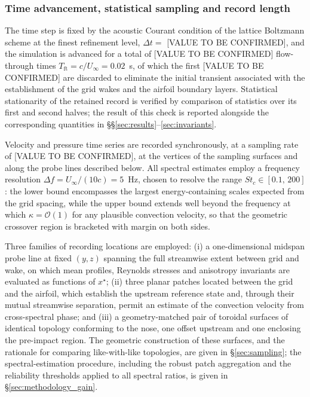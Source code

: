 \documentclass[lineno]{JFM-FLM_Au}
\begin{document}
\subsubsection{Time advancement, statistical sampling and record length}

The time step is fixed by the acoustic Courant condition of the lattice
Boltzmann scheme at the finest refinement level,
$\Delta t = $ [VALUE TO BE CONFIRMED], and the simulation is advanced
for a total of [VALUE TO BE CONFIRMED] flow-through times
$T_{\mathrm{ft}} = c/U_{\infty} = 0.02$~s, of which the first
[VALUE TO BE CONFIRMED] are discarded to eliminate the initial
transient associated with the establishment of the grid wakes and the
airfoil boundary layers. Statistical stationarity of the retained
record is verified by comparison of statistics over its first and
second halves; the result of this check is reported alongside the
corresponding quantities in \S\S\ref{sec:results}--\ref{sec:invariants}.

Velocity and pressure time series are recorded synchronously, at a
sampling rate of [VALUE TO BE CONFIRMED], at the vertices of the
sampling surfaces and along the probe lines described below. All
spectral estimates employ a frequency resolution
$\Delta f = U_{\infty}/(10c) = 5$~Hz, chosen to resolve the range
$St_c \in [0.1,\,200]$: the lower bound encompasses the largest
energy-containing scales expected from the grid spacing, while the
upper bound extends well beyond the frequency at which
$\kappa = \mathcal{O}(1)$ for any plausible convection velocity, so
that the geometric crossover region is bracketed with margin on both
sides.

Three families of recording locations are employed: (i) a
one-dimensional midspan probe line at fixed $(y,z)$ spanning the full
streamwise extent between grid and wake, on which mean profiles,
Reynolds stresses and anisotropy invariants are evaluated as functions
of $x^{\star}$; (ii) three planar patches located between the grid and
the airfoil, which establish the upstream reference state and, through
their mutual streamwise separation, permit an estimate of the
convection velocity from cross-spectral phase; and (iii) a
geometry-matched pair of toroidal surfaces of identical topology
conforming to the nose, one offset upstream and one enclosing the
pre-impact region. The geometric construction of these surfaces, and
the rationale for comparing like-with-like topologies, are given in
\S\ref{sec:sampling}; the spectral-estimation procedure, including the
robust patch aggregation and the reliability thresholds applied to all
spectral ratios, is given in \S\ref{sec:methodology_gain}.
\end{document}
